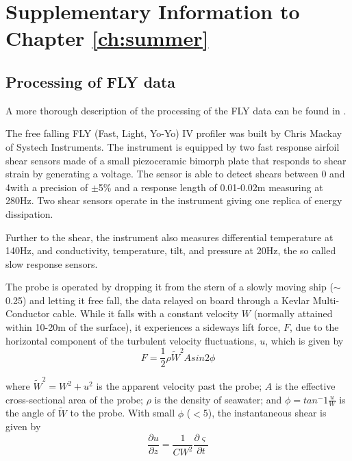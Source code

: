 \chapter{Supplementary Information to Chapter \ref{ch:summer}}
\section{Processing of FLY data}\label{ap:fly}


A more thorough description of the processing of the FLY data can
be found in \citet{Inall98}.

The free falling FLY (Fast, Light, Yo-Yo) IV profiler was built by
Chris Mackay of Systech Instruments. The instrument is equipped by
two fast response airfoil shear sensors made of a small
piezoceramic bimorph plate that responds to shear strain by
generating a voltage. The sensor is able to detect shears between
0 and 4\shear with a precision of $\pm$5\% and a response length
of 0.01-0.02m \citep{Dewey87} measuring at 280Hz. Two shear
sensors operate in the instrument giving one replica of energy
dissipation.

Further to the shear, the instrument also measures differential
temperature at 140Hz, and conductivity, temperature, tilt, and
pressure at 20Hz, the so called slow response sensors.

The probe is operated by dropping it from the stern of a slowly
moving ship ($\sim$0.25\vel) and letting it free fall, the data
relayed on board through a Kevlar Multi-Conductor cable. While it
falls with a constant velocity $W$ (normally attained within
10-20m of the surface), it experiences a sideways lift force, $F$,
due to the horizontal component of the turbulent velocity
fluctuations, $u$, which is given by \citep{Crawford76}
\begin{equation}
F=\frac{1}{2}\rho\tilde{W}^2A sin 2\phi
\end{equation}

where $\tilde{W}^2=W^2 + u^2$ is the apparent velocity past the
probe; $A$ is the effective cross-sectional area of the probe;
$\rho$ is the density of seawater; and $\phi=tan^-1 \frac{u}{W}$
is the angle of $\tilde{W}$ to the probe. With small $\phi$
($<$5\deg), the instantaneous shear is given by
\begin{equation}
\frac{\partial u}{\partial z}=\frac{1}{CW^2}\frac{\partial
\varsigma}{\partial t}
\end{equation}

